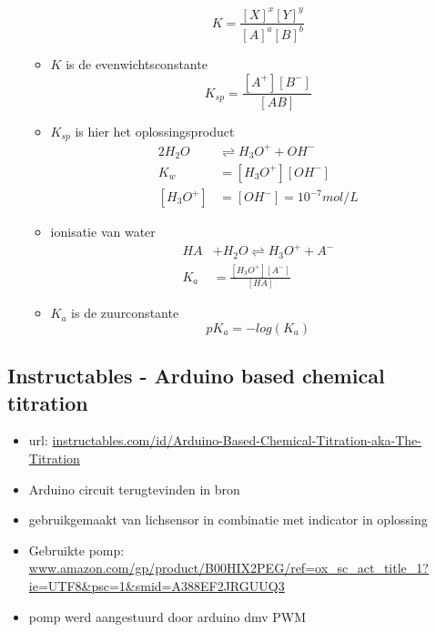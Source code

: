 \documentclass[10pt]{report}
\begin{document}
\begin{itemize}
\begin{itemize}
\begin{equation*}
                K = \frac{[X]^x[Y]^y}{[A]^a[B]^b}
            \end{equation*}
            \item $K$ is de evenwichtsconstante
            \begin{equation*}
                K_{sp} = \frac{[A^+][B^-]}{[AB]}
            \end{equation*}
            \item $K_{sp}$ is hier het oplossingsproduct
            \begin{equation*}
                \begin{split}
                    2H_2O &\rightleftharpoons H_3O^+ + OH^-\\
                    K_w &= [H_3O^+][OH^-]\\
                    [H_3O^+] &= [OH^-] = 10^{-7} mol/L
                \end{split}
            \end{equation*}
            \item ionisatie van water
            \begin{equation*}
                \begin{split}
                    HA &+ H_2O \rightleftharpoons H_3O^+ + A^-\\
                    K_a &= \frac{[H_3O^+][A^-]}{[HA]}
                \end{split}
            \end{equation*}
            \item $K_a$ is de zuurconstante
            \begin{equation*}
                pK_a = -log(K_a)
            \end{equation*}    
        \end{itemize}
\end{itemize}

\subsection{Instructables - Arduino based chemical titration}
\begin{itemize}
    \item url: \url{instructables.com/id/Arduino-Based-Chemical-Titration-aka-The-Titration}
\end{itemize}
\begin{itemize}
    \item Arduino circuit terugtevinden in bron
    \item gebruikgemaakt van lichsensor in combinatie met indicator in oplossing
    \item Gebruikte pomp: \url{www.amazon.com/gp/product/B00HIX2PEG/ref=ox_sc_act_title_1?ie=UTF8&psc=1&smid=A388EF2JRGUUQ3}
    \item pomp werd aangestuurd door arduino dmv PWM
\end{itemize}
\end{document}
